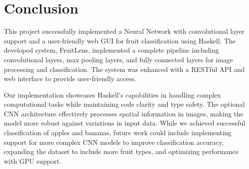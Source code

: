 \section{Conclusion}\label{sec:Conclusion}
This project successfully implemented a Neural Network with convolutional layer support and a user-friendly web GUI for fruit classification using Haskell. The developed system, FruitLens, implemented a complete pipeline including convolutional layers, max pooling layers, and fully connected layers for image processing and classification. The system was enhanced with a RESTful API and web interface to provide user-friendly access.

Our implementation showcases Haskell's capabilities in handling complex computational tasks while maintaining code clarity and type safety. The optional CNN architecture effectively processes spatial information in images, making the model more robust against variations in input data. While we achieved successful classification of apples and bananas, future work could include implementing support for more complex CNN models to improve classification accuracy, expanding the dataset to include more fruit types, and optimizing performance with GPU support.
